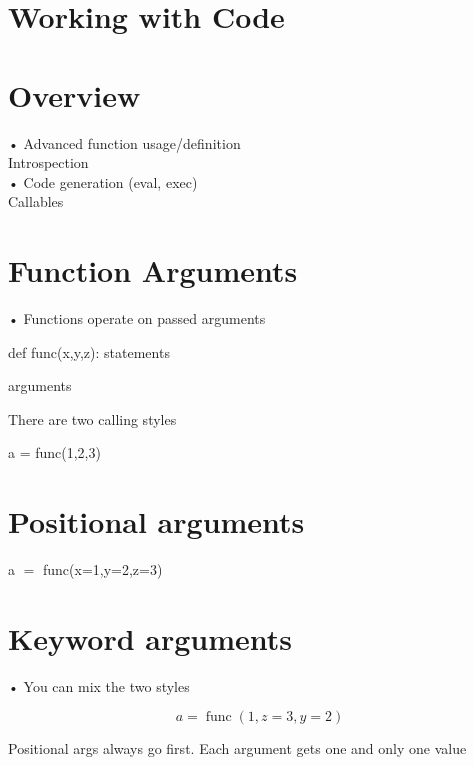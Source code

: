 \documentclass[
  letterpaper,
  DIV=11,
  numbers=noendperiod]{scrreprt}
\begin{document}

\chapter{Working with Code}\label{working-with-code}


\chapter{Overview}\label{overview-3}

• Advanced function usage/definition\\
Introspection\\
• Code generation (eval, exec)\\
Callables


\chapter{Function Arguments}\label{function-arguments}

• Functions operate on passed arguments

def func(x,y,z): statements

arguments

There are two calling styles

a = func(1,2,3)


\chapter{Positional arguments}\label{positional-arguments}

a \(=\) func(x=1,y=2,z=3)


\chapter{Keyword arguments}\label{keyword-arguments-1}

• You can mix the two styles

\[
a = \operatorname {f u n c} (1, z = 3, y = 2)
\]

Positional args always go first. Each argument gets one and only one
value

\end{document}

